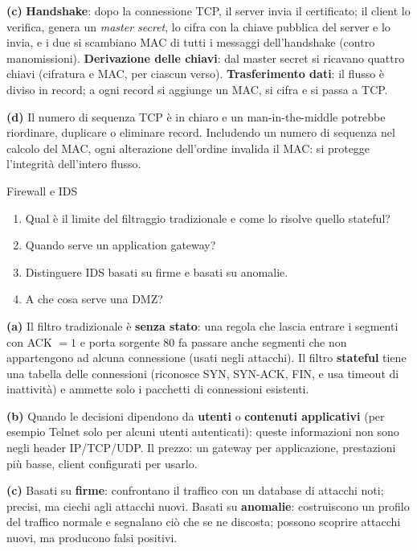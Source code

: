 \textbf{(c)} \textbf{Handshake}: dopo la connessione TCP, il server invia il certificato; il client lo verifica, genera un \emph{master secret},
lo cifra con la chiave pubblica del server e lo invia, e i due si scambiano MAC di tutti i messaggi dell'handshake (contro manomissioni).
\textbf{Derivazione delle chiavi}: dal master secret si ricavano quattro chiavi (cifratura e MAC, per ciascun verso). \textbf{Trasferimento
dati}: il flusso è diviso in record; a ogni record si aggiunge un MAC, si cifra e si passa a TCP.

\textbf{(d)} Il numero di sequenza TCP è in chiaro e un man-in-the-middle potrebbe riordinare, duplicare o eliminare record. Includendo un
numero di sequenza nel calcolo del MAC, ogni alterazione dell'ordine invalida il MAC: si protegge l'integrità dell'intero flusso.

\begin{esercizio}{Firewall e IDS}
\begin{enumerate}[label=(\alph*)]
    \item Qual è il limite del filtraggio tradizionale e come lo risolve quello stateful?
    \item Quando serve un application gateway?
    \item Distinguere IDS basati su firme e basati su anomalie.
    \item A che cosa serve una DMZ?
\end{enumerate}
\end{esercizio}

\svolgimento
\textbf{(a)} Il filtro tradizionale è \textbf{senza stato}: una regola che lascia entrare i segmenti con ACK $= 1$ e porta sorgente 80
fa passare anche segmenti che non appartengono ad alcuna connessione (usati negli attacchi). Il filtro \textbf{stateful} tiene una tabella
delle connessioni (riconosce SYN, SYN-ACK, FIN, e usa timeout di inattività) e ammette solo i pacchetti di connessioni esistenti.

\textbf{(b)} Quando le decisioni dipendono da \textbf{utenti} o \textbf{contenuti applicativi} (per esempio Telnet solo per alcuni utenti
autenticati): queste informazioni non sono negli header IP/TCP/UDP. Il prezzo: un gateway per applicazione, prestazioni più basse, client
configurati per usarlo.

\textbf{(c)} Basati su \textbf{firme}: confrontano il traffico con un database di attacchi noti; precisi, ma ciechi agli attacchi nuovi. Basati
su \textbf{anomalie}: costruiscono un profilo del traffico normale e segnalano ciò che se ne discosta; possono scoprire attacchi nuovi, ma
producono falsi positivi.

